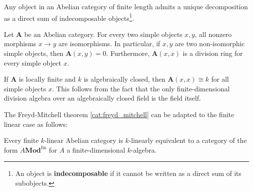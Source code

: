     \begin{theorem}
        Any object in an Abelian category of finite length admits a unique decomposition as a direct sum of indecomposable objects\footnote{An object is \textbf{indecomposable} if it cannot be written as a direct sum of its subobjects.}.
    \end{theorem}


    \begin{theorem}\label{cat:schur_lemma}
        Let $\mathbf{A}$ be an Abelian category. For every two simple objects $x,y$, all nonzero morphisms $x\rightarrow y$ are isomorphisms. In particular, if $x,y$ are two non-isomorphic simple objects, then $\mathbf{A}(x,y)=0$. Furthermore, $\mathbf{A}(x,x)$ is a division ring for every simple object $x$.
    \end{theorem}
    \begin{result}
        If $\mathbf{A}$ is locally finite and $k$ is algebraically closed, then $\mathbf{A}(x,x)\cong k$ for all simple objects $x$. This follows from the fact that the only finite-dimensional division algebra over an algebraically closed field is the field itself.
    \end{result}

    The Freyd-Mitchell theorem \ref{cat:freyd_mitchell} can be adapted to the finite linear case as follows:
    \begin{theorem}[Deligne]
        Every finite $k$-linear Abelian category is $k$-linearly equivalent to a category of the form $A\mathbf{Mod}^\mathrm{fin}$ for $A$ a finite-dimensional $k$-algebra.
    \end{theorem}

